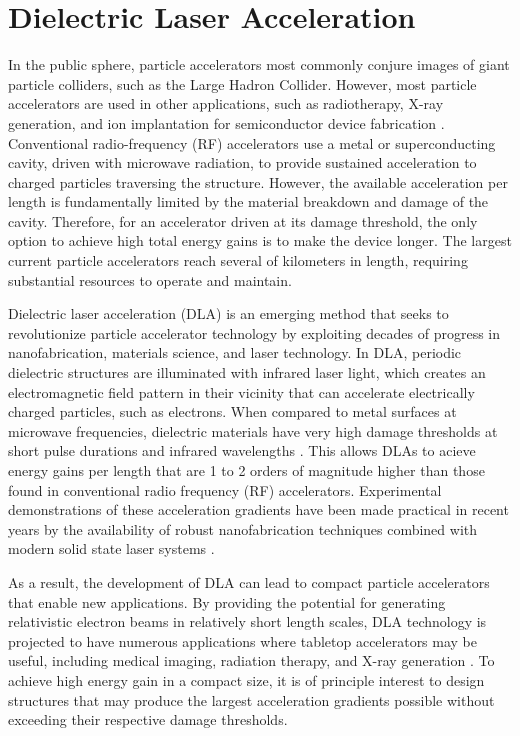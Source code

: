 
\section{Dielectric Laser Acceleration}

In the public sphere, particle accelerators most commonly conjure images of giant particle colliders, such as the Large Hadron Collider.
However, most particle accelerators are used in other applications, such as radiotherapy, X-ray generation, and ion implantation for semiconductor device fabrication \cite{england2014dielectric}.
Conventional radio-frequency (RF) accelerators use a metal or superconducting cavity, driven with microwave radiation, to provide sustained acceleration to charged particles traversing the structure.
However, the available acceleration per length is fundamentally limited by the material breakdown and damage of the cavity.
Therefore, for an accelerator driven at its damage threshold, the only option to achieve high total energy gains is to make the device longer.
The largest current particle accelerators reach several of kilometers in length, requiring substantial resources to operate and maintain.

Dielectric laser acceleration (DLA) is an emerging method that seeks to revolutionize particle accelerator technology by exploiting decades of progress in nanofabrication, materials science, and laser technology. 
In DLA, periodic dielectric structures are illuminated with infrared laser light, which creates an electromagnetic field pattern in their vicinity that can accelerate electrically charged particles, such as electrons.
When compared to metal surfaces at microwave frequencies, dielectric materials have very high damage thresholds at short pulse durations and infrared wavelengths \cite{mcneur2016elements, soong2012laser}.
This allows DLAs to acieve energy gains per length that are 1 to 2 orders of magnitude higher than those found in conventional radio frequency (RF) accelerators.
Experimental demonstrations of these acceleration gradients have been made practical in recent years by the availability of robust nanofabrication techniques combined with modern solid state laser systems \cite{dawson2008analysis}.

As a result, the development of DLA can lead to compact particle accelerators that enable new applications.
By providing the potential for generating relativistic electron beams in relatively short length scales, DLA technology is projected to have numerous applications where tabletop accelerators may be useful, including medical imaging, radiation therapy, and X-ray generation \cite{plettner2008microstructure,england2014dielectric}.
To achieve high energy gain in a compact size, it is of principle interest to design structures that may produce the largest acceleration gradients possible without exceeding their respective damage thresholds.

